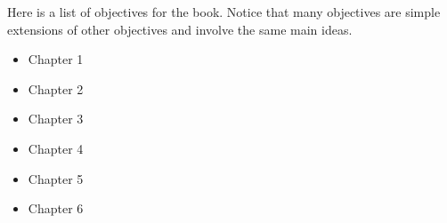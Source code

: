 \documentclass[letterpaper,oneside]{article}%
\begin{document}
Here is a list of objectives for the book.  Notice that many
objectives are simple extensions of other objectives and involve the
same main ideas.  


\begin{itemize}
\item Chapter 1

\item Chapter 2

\item Chapter 3

\item Chapter 4

\item Chapter 5

\item Chapter 6

%
\end{itemize}
\end{document}
